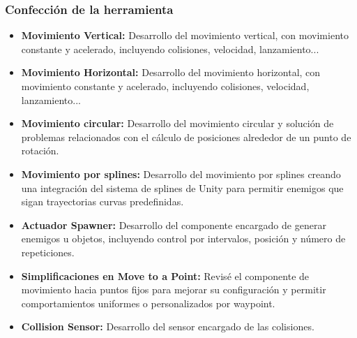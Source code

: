 \subsubsection{Confección de la herramienta}
\begin{itemize}
  \item \textbf{Movimiento Vertical:} Desarrollo del movimiento vertical, con movimiento constante y acelerado, incluyendo colisiones, velocidad, lanzamiento...
  \item \textbf{Movimiento Horizontal:} Desarrollo del movimiento horizontal, con movimiento constante y acelerado, incluyendo colisiones, velocidad, lanzamiento...
  \item \textbf{Movimiento circular:}  Desarrollo del movimiento circular y solución de problemas relacionados con el cálculo de posiciones alrededor de un punto de rotación.
  \item \textbf{Movimiento por splines:} Desarrollo del movimiento por splines creando una integración del sistema de splines de Unity para permitir enemigos que sigan trayectorias curvas predefinidas.
  \item \textbf{Actuador Spawner:} Desarrollo del componente encargado de generar enemigos u objetos, incluyendo control por intervalos, posición y número de repeticiones.
  \item \textbf{Simplificaciones en Move to a Point:} Revisé el componente de movimiento hacia puntos fijos para mejorar su configuración y permitir comportamientos uniformes o personalizados por waypoint.
  \item \textbf{Collision Sensor:}  Desarrollo del sensor encargado de las colisiones.


\end{itemize}
